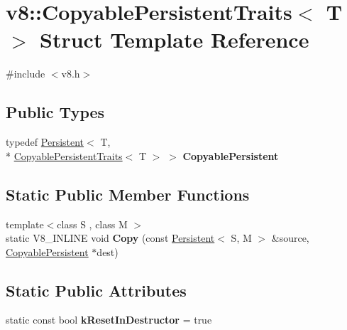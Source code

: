 \hypertarget{structv8_1_1CopyablePersistentTraits}{\section{v8\-:\-:Copyable\-Persistent\-Traits$<$ T $>$ Struct Template Reference}
\label{structv8_1_1CopyablePersistentTraits}
}


{\ttfamily \#include $<$v8.\-h$>$}

\subsection*{Public Types}
\begin{DoxyCompactItemize}
\item 
\hypertarget{structv8_1_1CopyablePersistentTraits_a327724a22ee06da5ae54dd29982d068e}{typedef \hyperlink{classv8_1_1Persistent}{Persistent}$<$ T, \\*
\hyperlink{structv8_1_1CopyablePersistentTraits}{Copyable\-Persistent\-Traits}$<$ T $>$ $>$ {\bfseries Copyable\-Persistent}}\label{structv8_1_1CopyablePersistentTraits_a327724a22ee06da5ae54dd29982d068e}

\end{DoxyCompactItemize}
\subsection*{Static Public Member Functions}
\begin{DoxyCompactItemize}
\item 
\hypertarget{structv8_1_1CopyablePersistentTraits_aa8adf12936633b5f13b624541acaa1cf}{{\footnotesize template$<$class S , class M $>$ }\\static V8\-\_\-\-I\-N\-L\-I\-N\-E void {\bfseries Copy} (const \hyperlink{classv8_1_1Persistent}{Persistent}$<$ S, M $>$ \&source, \hyperlink{classv8_1_1Persistent}{Copyable\-Persistent} $\ast$dest)}\label{structv8_1_1CopyablePersistentTraits_aa8adf12936633b5f13b624541acaa1cf}

\end{DoxyCompactItemize}
\subsection*{Static Public Attributes}
\begin{DoxyCompactItemize}
\item 
\hypertarget{structv8_1_1CopyablePersistentTraits_a1a10842e15d8ee11f78da030bdffd025}{static const bool {\bfseries k\-Reset\-In\-Destructor} = true}\label{structv8_1_1CopyablePersistentTraits_a1a10842e15d8ee11f78da030bdffd025}

\end{DoxyCompactItemize}


